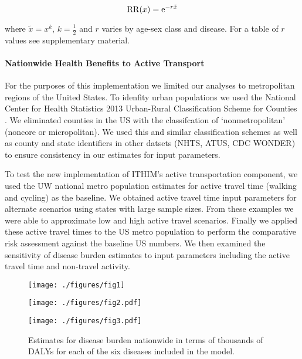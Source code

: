 \begin{equation}
\mathrm{RR}(x) = \mathrm{e}^{-r \tilde{x}}
\end{equation}

where $\tilde{x} = x^k$, $k=\frac{1}{2}$ and $r$ varies by age-sex
class and disease.  For a table of $r$ values see supplementary
material.

\paragraph{Nationwide Health Benefits to Active Transport}

For the purposes of this implementation we limited our analyses to
metropolitan regions of the United States. To idenfity urban
populations we used the National Center for Health Statistics 2013
Urban-Rural Classification Scheme for Counties \cite{ingram2014}. We
eliminated counties in the US with the classifcation of
`nonmetropolitan' (noncore or micropolitan). We used this and similar
classification schemes as well as county and state identifiers in
other datsets (NHTS, ATUS, CDC WONDER) to ensure consistency in our
estimates for input parameters.

To test the new implementation of ITHIM's active transportation
component, we used the UW national metro population estimates for
active travel time (walking and cycling) as the baseline. We obtained
active travel time input parameters for alternate scenarios using
states with large sample sizes. From these examples we were able to
approximate low and high active travel scenarios. Finally we applied
these active travel times to the US metro population to perform the
comparative risk assessment against the baseline US numbers. We then
examined the sensitivity of disease burden estimates to input
parameters including the active travel time and non-travel activity.

\begin{figure}[t]
  \centerline{\texttt{[image: ./figures/fig1]}}
    \caption{}\label{fig1}
\end{figure}

\begin{figure}[t]
  \centerline{\texttt{[image: ./figures/fig2.pdf]}}
    \caption{}\label{fig2}
\end{figure}

\begin{figure}[t]
  \centerline{\texttt{[image: ./figures/fig3.pdf]}}
  \caption{Estimates for disease burden nationwide in terms of thousands of
    DALYs for each of the six diseases included in the model.
  }\label{fig3}
\end{figure}
